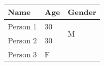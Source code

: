 \documentclass{article}
\begin{document}
\begin{tabular}{| l | l | l |}
\hline
Name & Age & Gender\\ \hline
Person 1
& 30
& \multirow{2}{*}{M}
\\ \hline

Person 2
& 30
\\ \hline

Person 3
& \multicolumn{2}{l}{F}
\\ \hline

\end{tabular}
\end{document}
